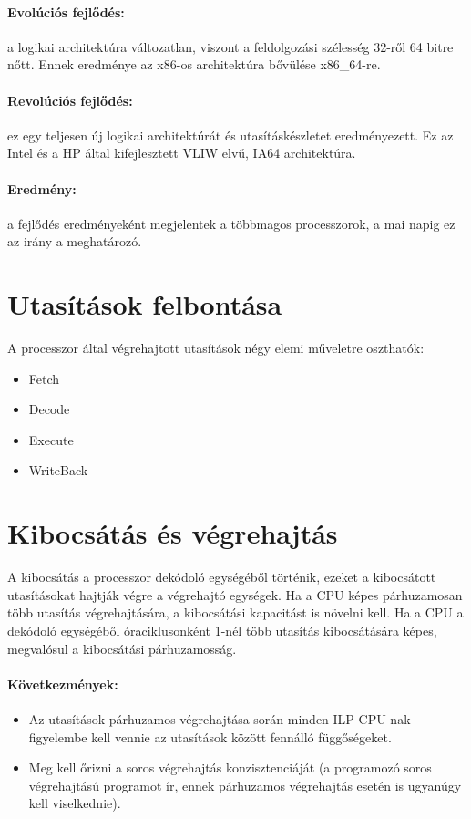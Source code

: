 \paragraph{Evolúciós fejlődés:} a logikai architektúra változatlan, viszont a feldolgozási szélesség 32-ről 64 bitre nőtt.
Ennek eredménye az x86-os architektúra bővülése x86\_64-re.
\paragraph{Revolúciós fejlődés:} ez egy teljesen új logikai architektúrát és utasításkészletet eredményezett.
Ez az Intel és a HP által kifejlesztett VLIW elvű, IA64 architektúra.
\paragraph{Eredmény:} a fejlődés eredményeként megjelentek a többmagos processzorok, a mai napig ez az irány a meghatározó.

\section{Utasítások felbontása}
A processzor által végrehajtott utasítások négy elemi műveletre oszthatók:
\begin{itemize}
    \item Fetch
    \item Decode
    \item Execute
    \item WriteBack
\end{itemize}

\section{Kibocsátás és végrehajtás}
A kibocsátás a processzor dekódoló egységéből történik, ezeket a kibocsátott utasításokat hajtják végre a végrehajtó egységek.
Ha a CPU képes párhuzamosan több utasítás végrehajtására, a kibocsátási kapacitást is növelni kell.
Ha a CPU a dekódoló egységéből óraciklusonként 1-nél több utasítás kibocsátására képes, megvalósul a kibocsátási párhuzamosság.
\paragraph{Következmények:}
\begin{itemize}
    \item Az utasítások párhuzamos végrehajtása során minden ILP CPU-nak figyelembe kell vennie az utasítások között fennálló függőségeket.
    \item Meg kell őrizni a soros végrehajtás konzisztenciáját (a programozó soros végrehajtású programot ír, ennek párhuzamos végrehajtás esetén is ugyanúgy kell viselkednie).
\end{itemize}
